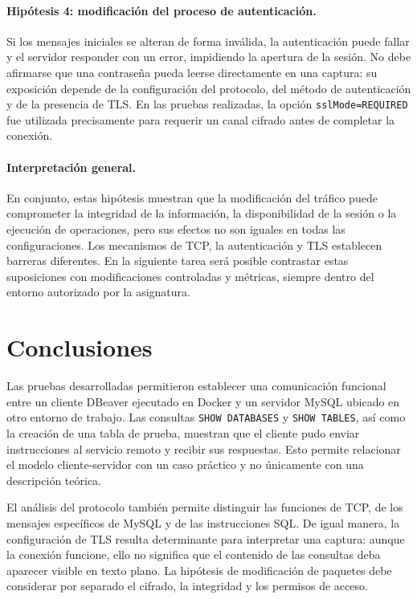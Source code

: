 \documentclass[10pt,a4paper]{article}
\begin{document}
\paragraph{Hipótesis 4: modificación del proceso de autenticación.}
Si los mensajes iniciales se alteran de forma inválida, la autenticación puede fallar y el servidor responder con un error, impidiendo la apertura de la sesión. No debe afirmarse que una contraseña pueda leerse directamente en una captura: su exposición depende de la configuración del protocolo, del método de autenticación y de la presencia de TLS. En las pruebas realizadas, la opción \texttt{sslMode=REQUIRED} fue utilizada precisamente para requerir un canal cifrado antes de completar la conexión.

\paragraph{Interpretación general.}
En conjunto, estas hipótesis muestran que la modificación del tráfico puede comprometer la integridad de la información, la disponibilidad de la sesión o la ejecución de operaciones, pero sus efectos no son iguales en todas las configuraciones. Los mecanismos de TCP, la autenticación y TLS establecen barreras diferentes. En la siguiente tarea será posible contrastar estas suposiciones con modificaciones controladas y métricas, siempre dentro del entorno autorizado por la asignatura.

\clearpage
\section*{Conclusiones}
Las pruebas desarrolladas permitieron establecer una comunicación funcional entre un cliente DBeaver ejecutado en Docker y un servidor MySQL ubicado en otro entorno de trabajo. Las consultas \texttt{SHOW DATABASES} y \texttt{SHOW TABLES}, así como la creación de una tabla de prueba, muestran que el cliente pudo enviar instrucciones al servicio remoto y recibir sus respuestas. Esto permite relacionar el modelo cliente-servidor con un caso práctico y no únicamente con una descripción teórica.

El análisis del protocolo también permite distinguir las funciones de TCP, de los mensajes específicos de MySQL y de las instrucciones SQL. De igual manera, la configuración de TLS resulta determinante para interpretar una captura: aunque la conexión funcione, ello no significa que el contenido de las consultas deba aparecer visible en texto plano. La hipótesis de modificación de paquetes debe considerar por separado el cifrado, la integridad y los permisos de acceso.
\end{document}
